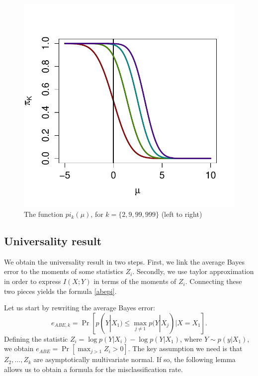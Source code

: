 \documentclass{article}
\begin{document}
\begin{figure}
\centering
\includegraphics[scale = 0.5, clip=true, trim=0 0.2in 0 0.5in]{../info_theory_sims/illus_piK.pdf}
\caption{The function $pi_k(\mu)$, for $k = \{2, 9, 99, 999\}$ (left to right) \label{fig:pi}}
\end{figure}

\subsection{Universality result}

We obtain the universality result in two steps.  First, we link the average Bayes error to the moments of
some statistics $Z_i$.  Secondly, we use taylor approximation in order to express $I(X; Y)$ in terms of the moments of $Z_i$.  Connecting these two pieces yields the formula \eqref{abepi}.

Let us start by rewriting the average Bayes error:
\[
e_{ABE, k} = \Pr[p(Y|X_1) \leq \max_{j \neq 1} p(Y|X_j)| X = X_1].
\]
Defining the statistic $Z_i = \log p(Y|X_i) - \log p(Y|X_1)$, where $Y \sim p(y|X_1)$, we obtain $
e_{ABE} = \Pr[\max_{j > 1} Z_i > 0].
$
The key assumption we need is that $Z_2,\hdots, Z_k$ are asymptotically multivariate normal.
If so, the following lemma
allows us to obtain a formula for the misclassification rate.
\end{document}

